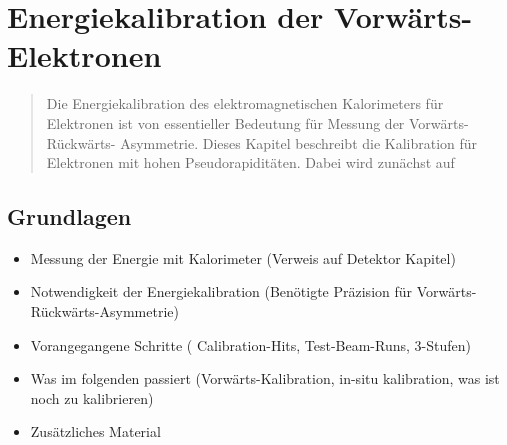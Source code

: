


%
\chapter{Energiekalibration der Vorwärts-Elektronen}
\label{energy_calibration}

\begin{quote}
    Die Energiekalibration des elektromagnetischen Kalorimeters für Elektronen 
    ist von essentieller Bedeutung für Messung der Vorwärts-Rückwärts-
    Asymmetrie. Dieses Kapitel beschreibt die Kalibration für Elektronen mit
    hohen Pseudorapiditäten. Dabei wird zunächst auf \development 
\end{quote}



%
\section{Grundlagen}
\label{energy_calibration:grundlagen}
\begin{itemize}
    \item Messung der Energie mit Kalorimeter (Verweis auf Detektor Kapitel)
    \item Notwendigkeit der Energiekalibration (Benötigte Präzision für 
        Vorwärts-Rückwärts-Asymmetrie)
    \item Vorangegangene Schritte ( Calibration-Hits, Test-Beam-Runs, 3-Stufen)
    \item Was im folgenden passiert (Vorwärts-Kalibration, in-situ
        kalibration, was ist noch zu kalibrieren)
    \item Zusätzliches Material
\end{itemize}



%

